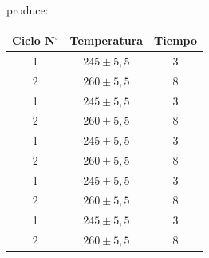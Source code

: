 \documentclass[a4,10pt]{aleph-notas}
\begin{document}
produce:

\color{green}
\begin{center}
    \begin{tabular}{|c|c|c|}
   \hline
    \textbf{Ciclo N$^\circ$} &	\textbf{Temperatura} & \textbf{Tiempo} \\ \hline
    1   & $245 \pm 5,5$ &	3 \\ \hline
    2	& $260 \pm 5,5$ &	8 \\ \hline
    1   & $245 \pm 5,5$ &	3 \\ \hline
    2	& $260 \pm 5,5$ &	8 \\ \hline
    1   & $245 \pm 5,5$ &	3 \\ \hline
    2	& $260 \pm 5,5$ &	8 \\ \hline
    1   & $245 \pm 5,5$ &	3 \\ \hline
    2	& $260 \pm 5,5$ &	8 \\ \hline
    1   & $245 \pm 5,5$ &	3 \\ \hline
    2	& $260 \pm 5,5$ &	8 \\ \hline
\end{tabular}
\end{center}

\color{black}


\end{document}
